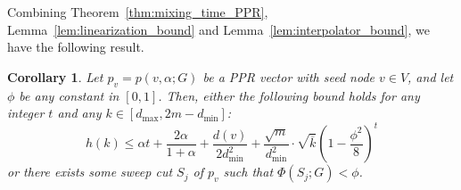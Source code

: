 \documentclass[11pt,twoside]{article}
\newtheorem{corollary}{Corollary}
\theoremstyle{definition}
\newcommand{\1}{\mathbbm{1}}
\begin{document}
Combining Theorem~\ref{thm:mixing_time_PPR}, Lemma~\ref{lem:linearization_bound} and Lemma~\ref{lem:interpolator_bound}, we have the following result.
\begin{corollary}
	\label{cor:mixing_time_PPR}
	Let $p_v = p(v,\alpha;G)$ be a PPR vector with seed node $v \in V$, and let $\phi$ be any constant in $[0,1]$. Then, either the following bound holds for any integer $t$ and any $k \in [d_{\max},2m - d_{\min}]$:
	\begin{equation*}
	h(k) \leq \alpha t + \frac{2\alpha}{1 + \alpha} + \frac{d(v)}{2d_{\min}^2} + \frac{\sqrt{m}}{d_{\min}^2} \cdot \sqrt{\overline{k}} \left(1 - \frac{\phi^2}{8}\right)^{t}
	\end{equation*}
	or there exists some sweep cut $S_j$ of $p_v$ such that $\Phi(S_j;G) < \phi$.
\end{corollary}
\end{document}
